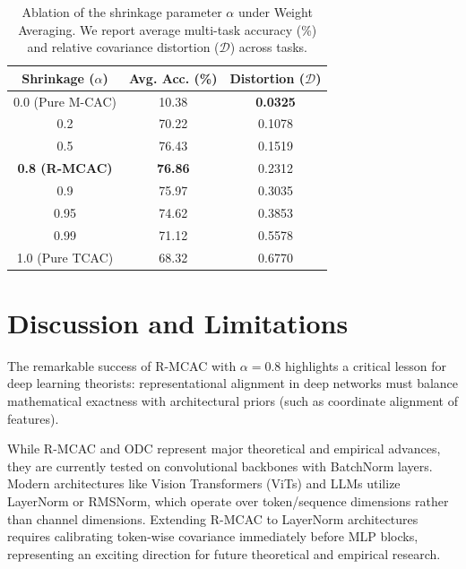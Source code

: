 \documentclass{article}
\theoremstyle{plain}
\theoremstyle{definition}
\theoremstyle{remark}
\begin{document}
\begin{table}[h]
  \caption{Ablation of the shrinkage parameter $\alpha$ under Weight Averaging. We report average multi-task accuracy (\%) and relative covariance distortion ($\mathcal{D}$) across tasks.}
  \label{tab:ablation_alpha}
  \vskip 0.1in
  \begin{center}
    \begin{small}
      \setlength{\tabcolsep}{4pt}
      \begin{tabular}{ccc}
        \toprule
        Shrinkage ($\alpha$) & Avg. Acc. (\%) & Distortion ($\mathcal{D}$) \\
        \midrule
        0.0 (Pure M-CAC) & 10.38 & \textbf{0.0325} \\
        0.2 & 70.22 & 0.1078 \\
        0.5 & 76.43 & 0.1519 \\
        \textbf{0.8 (R-MCAC)} & \textbf{76.86} & 0.2312 \\
        0.9 & 75.97 & 0.3035 \\
        0.95 & 74.62 & 0.3853 \\
        0.99 & 71.12 & 0.5578 \\
        1.0 (Pure TCAC) & 68.32 & 0.6770 \\
        \bottomrule
      \end{tabular}
    \end{small}
  \end{center}
  \vskip -0.1in
\end{table}

\section{Discussion and Limitations}
\label{sec:discussion}
The remarkable success of R-MCAC with $\alpha=0.8$ highlights a critical lesson for deep learning theorists: representational alignment in deep networks must balance mathematical exactness with architectural priors (such as coordinate alignment of features). 

While R-MCAC and ODC represent major theoretical and empirical advances, they are currently tested on convolutional backbones with BatchNorm layers. Modern architectures like Vision Transformers (ViTs) and LLMs utilize LayerNorm or RMSNorm, which operate over token/sequence dimensions rather than channel dimensions. Extending R-MCAC to LayerNorm architectures requires calibrating token-wise covariance immediately before MLP blocks, representing an exciting direction for future theoretical and empirical research.
\end{document}
